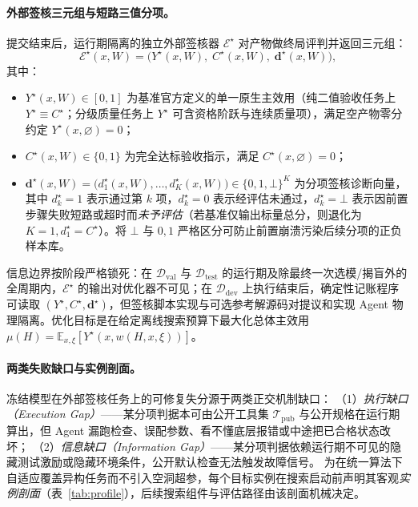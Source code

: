 \documentclass[UTF8,a4paper,10.5pt]{ctexart}
\newcommand{\Ddev}{\mathcal{D}_{\mathrm{dev}}}
\newcommand{\Dval}{\mathcal{D}_{\mathrm{val}}}
\newcommand{\Dtest}{\mathcal{D}_{\mathrm{test}}}
\newcommand{\E}{\mathbb{E}}
\begin{document}
\paragraph{外部签核三元组与短路三值分项。}
提交结束后，运行期隔离的独立外部签核器 $\mathcal{E}^\star$ 对产物做终局评判并返回三元组：
\begin{equation}
  \mathcal{E}^\star(x, W) = \bigl(Y^\star(x,W),\; C^\star(x,W),\; \mathbf{d}^\star(x,W)\bigr),
\end{equation}
其中：
\begin{itemize}
  \item $Y^\star(x,W)\in[0,1]$ 为基准官方定义的单一原生主效用（纯二值验收任务上 $Y^\star\equiv C^\star$；分级质量任务上 $Y^\star$ 可含资格阶跃与连续质量项），满足空产物零分约定 $Y^\star(x,\varnothing)=0$；
  \item $C^\star(x,W)\in\{0,1\}$ 为完全达标验收指示，满足 $C^\star(x,\varnothing)=0$；
  \item $\mathbf{d}^\star(x,W)=\bigl(d^\star_1(x,W),\dots,d^\star_K(x,W)\bigr)\in\{0,1,\bot\}^K$ 为分项签核诊断向量，其中 $d^\star_k=1$ 表示通过第 $k$ 项，$d^\star_k=0$ 表示经评估未通过，$d^\star_k=\bot$ 表示因前置步骤失败短路或超时而\emph{未予评估}（若基准仅输出标量总分，则退化为 $K=1, d^\star_1=C^\star$）。将 $\bot$ 与 $0,1$ 严格区分可防止前置崩溃污染后续分项的正负样本库。
\end{itemize}
信息边界按阶段严格锁死：在 $\Dval$ 与 $\Dtest$ 的运行期及除最终一次选模/揭盲外的全周期内，$\mathcal{E}^\star$ 的输出对优化器不可见；在 $\Ddev$ 上执行结束后，确定性记账程序可读取 $(Y^\star,C^\star,\mathbf{d}^\star)$，但签核脚本实现与可选参考解源码对提议和实现 Agent 物理隔离。优化目标是在给定离线搜索预算下最大化总体主效用 $\mu(H)=\E_{x,\xi}[Y^\star(x,w(H,x,\xi))]$。

\paragraph{两类失败缺口与实例剖面。}
冻结模型在外部签核任务上的可修复失分源于两类正交机制缺口：
（1）\emph{执行缺口（Execution Gap）}——某分项判据本可由公开工具集 $\mathcal{T}_{\mathrm{pub}}$ 与公开规格在运行期算出，但 Agent 漏跑检查、误配参数、看不懂底层报错或中途把已合格状态改坏；
（2）\emph{信息缺口（Information Gap）}——某分项判据依赖运行期不可见的隐藏测试激励或隐藏环境条件，公开默认检查无法触发故障信号。
为在统一算法下自适应覆盖异构任务而不引入空洞超参，每个目标实例在搜索启动前声明其客观\emph{实例剖面}（表~\ref{tab:profile}），后续搜索组件与评估路径由该剖面机械决定。
\end{document}
